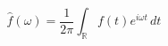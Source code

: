 \documentclass{article}
\begin{document}
\begin{equation}
  \hat{f}(\omega) = \frac{1}{2 \pi} \int_\mathbb{R} f(t) e^{i\omega t} \,dt
\end{equation}
\end{document}
